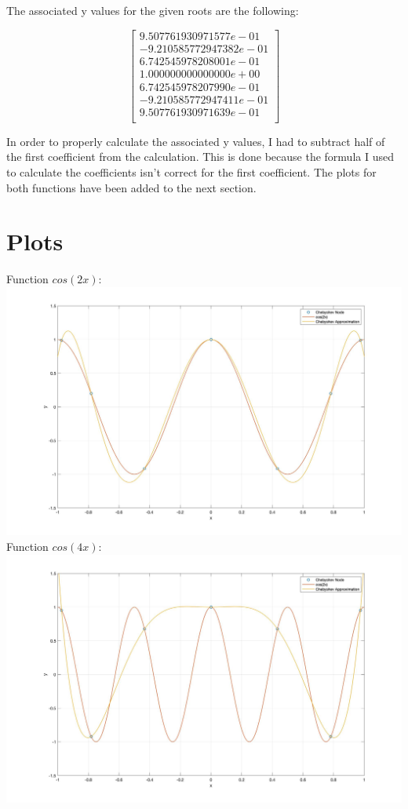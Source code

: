 \documentclass{article}
\begin{document}
The associated y values for the given roots are the following:

$$
\begin{bmatrix} 
9.507761930971577e-01\\
-9.210585772947382e-01\\
6.742545978208001e-01\\
1.000000000000000e+00\\
6.742545978207990e-01\\
-9.210585772947411e-01\\
9.507761930971639e-01\\
\end{bmatrix}
$$

In order to properly calculate the associated y values, I had to subtract half of the first coefficient from the calculation. This is done because the formula I used to calculate the coefficients isn't correct for the first coefficient. The plots for both functions have been added to the next section.

\section{Plots}
Function $cos(2x)$:\\
\includegraphics[width=\textwidth,height=\textheight,keepaspectratio]{cos2x.jpg}\\
Function $cos(4x)$:\\
\includegraphics[width=\textwidth,height=\textheight,keepaspectratio]{cos4x.jpg}
\end{document}
